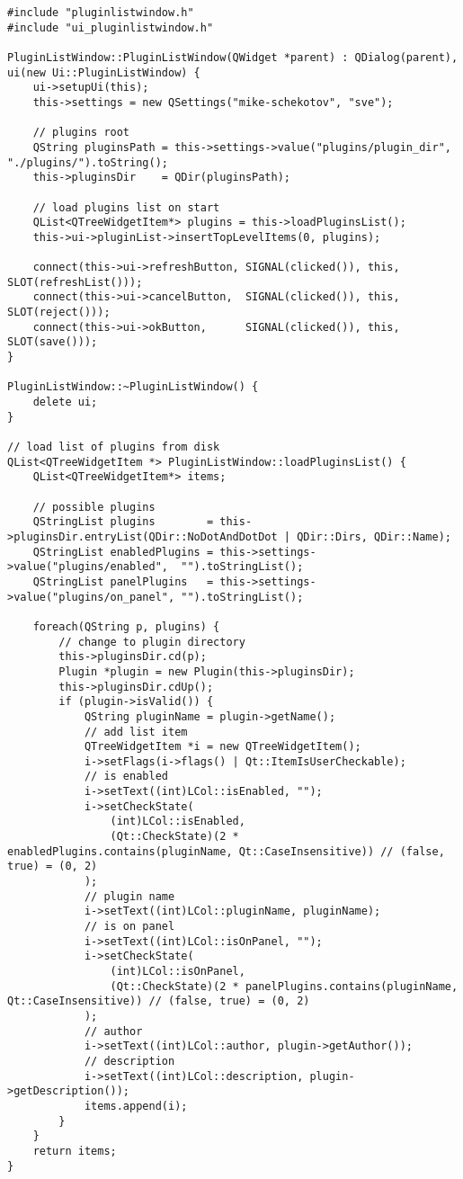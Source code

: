 \begin{lstlisting}
#include "pluginlistwindow.h"
#include "ui_pluginlistwindow.h"

PluginListWindow::PluginListWindow(QWidget *parent) : QDialog(parent), ui(new Ui::PluginListWindow) {
    ui->setupUi(this);
    this->settings = new QSettings("mike-schekotov", "sve");

    // plugins root
    QString pluginsPath = this->settings->value("plugins/plugin_dir", "./plugins/").toString();
    this->pluginsDir    = QDir(pluginsPath);

    // load plugins list on start
    QList<QTreeWidgetItem*> plugins = this->loadPluginsList();
    this->ui->pluginList->insertTopLevelItems(0, plugins);

    connect(this->ui->refreshButton, SIGNAL(clicked()), this, SLOT(refreshList()));
    connect(this->ui->cancelButton,  SIGNAL(clicked()), this, SLOT(reject()));
    connect(this->ui->okButton,      SIGNAL(clicked()), this, SLOT(save()));
}

PluginListWindow::~PluginListWindow() {
    delete ui;
}

// load list of plugins from disk
QList<QTreeWidgetItem *> PluginListWindow::loadPluginsList() {
    QList<QTreeWidgetItem*> items;

    // possible plugins
    QStringList plugins        = this->pluginsDir.entryList(QDir::NoDotAndDotDot | QDir::Dirs, QDir::Name);
    QStringList enabledPlugins = this->settings->value("plugins/enabled",  "").toStringList();
    QStringList panelPlugins   = this->settings->value("plugins/on_panel", "").toStringList();

    foreach(QString p, plugins) {
        // change to plugin directory
        this->pluginsDir.cd(p);
        Plugin *plugin = new Plugin(this->pluginsDir);
        this->pluginsDir.cdUp();
        if (plugin->isValid()) {
            QString pluginName = plugin->getName();
            // add list item
            QTreeWidgetItem *i = new QTreeWidgetItem();
            i->setFlags(i->flags() | Qt::ItemIsUserCheckable);
            // is enabled
            i->setText((int)LCol::isEnabled, "");
            i->setCheckState(
                (int)LCol::isEnabled,
                (Qt::CheckState)(2 * enabledPlugins.contains(pluginName, Qt::CaseInsensitive)) // (false, true) = (0, 2)
            );
            // plugin name
            i->setText((int)LCol::pluginName, pluginName);
            // is on panel
            i->setText((int)LCol::isOnPanel, "");
            i->setCheckState(
                (int)LCol::isOnPanel,
                (Qt::CheckState)(2 * panelPlugins.contains(pluginName, Qt::CaseInsensitive)) // (false, true) = (0, 2)
            );
            // author
            i->setText((int)LCol::author, plugin->getAuthor());
            // description
            i->setText((int)LCol::description, plugin->getDescription());
            items.append(i);
        }
    }
    return items;
}


\end{lstlisting}
